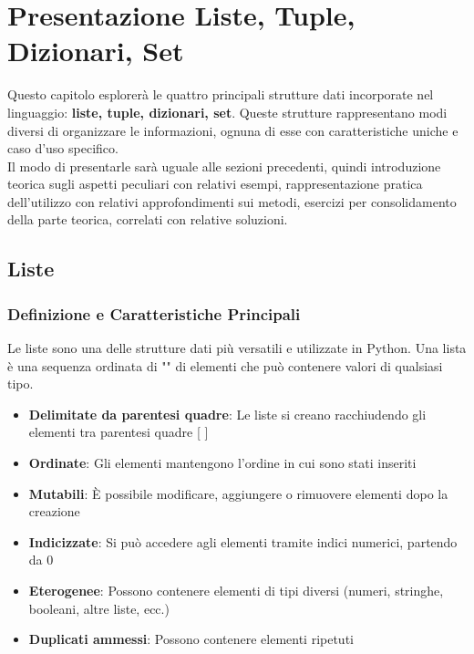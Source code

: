 \clearpage

\section{Presentazione Liste, Tuple, Dizionari, Set}

Questo capitolo esplorerà le quattro principali strutture dati incorporate nel linguaggio: \textbf{liste, tuple, dizionari, set}. Queste strutture rappresentano modi diversi di organizzare le informazioni, ognuna di esse con caratteristiche uniche e caso d'uso specifico.\\



Il modo di presentarle sarà uguale alle sezioni precedenti, quindi introduzione teorica sugli aspetti peculiari con relativi esempi, rappresentazione pratica dell'utilizzo con relativi approfondimenti sui metodi, esercizi per consolidamento della parte teorica, correlati con relative soluzioni.\\





\subsection{Liste}\label{ListeCap1}
\subsubsection{Definizione e Caratteristiche Principali}

Le liste sono una delle strutture dati più versatili e utilizzate in Python. Una lista è una sequenza ordinata di "\textbf{}" di elementi che può contenere valori di qualsiasi tipo.

\begin{tcolorbox}[colback=blue!5!white,colframe=blue!75!black,title=Caratteristiche principali delle liste]
\begin{itemize}
    \item \textbf{Delimitate da parentesi quadre}: Le liste si creano racchiudendo gli elementi tra parentesi quadre [ ]
    \item \textbf{Ordinate}: Gli elementi mantengono l'ordine in cui sono stati inseriti
    \item \textbf{Mutabili}: È possibile modificare, aggiungere o rimuovere elementi dopo la creazione
    \item \textbf{Indicizzate}: Si può accedere agli elementi tramite indici numerici, partendo da 0
    \item \textbf{Eterogenee}: Possono contenere elementi di tipi diversi (numeri, stringhe, booleani, altre liste, ecc.)
    \item \textbf{Duplicati ammessi}: Possono contenere elementi ripetuti
\end{itemize}
\end{tcolorbox}

